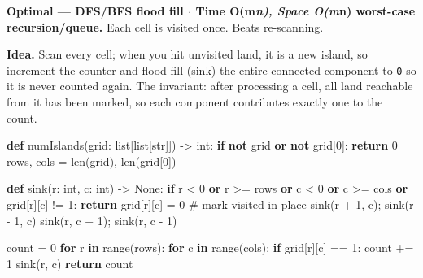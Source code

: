\documentclass[11pt]{article}
\newenvironment{Shaded}{\begin{snugshade}}{\end{snugshade}}
\newcommand{\BuiltInTok}[1]{\textcolor[rgb]{0.50,0.55,0.55}{#1}}
\newcommand{\CommentTok}[1]{\textcolor[rgb]{0.48,0.49,0.49}{#1}}
\newcommand{\ControlFlowTok}[1]{\textcolor[rgb]{0.99,0.74,0.29}{\textbf{#1}}}
\newcommand{\DecValTok}[1]{\textcolor[rgb]{0.96,0.45,0.00}{#1}}
\newcommand{\KeywordTok}[1]{\textcolor[rgb]{0.81,0.81,0.76}{\textbf{#1}}}
\newcommand{\NormalTok}[1]{\textcolor[rgb]{0.81,0.81,0.76}{#1}}
\newcommand{\OperatorTok}[1]{\textcolor[rgb]{0.81,0.81,0.76}{#1}}
\newcommand{\StringTok}[1]{\textcolor[rgb]{0.96,0.31,0.31}{#1}}
\newcommand{\VariableTok}[1]{\textcolor[rgb]{0.15,0.68,0.68}{#1}}
\begin{document}
\textbf{Optimal --- DFS/BFS flood fill \(\cdot\) Time O(m\emph{n), Space O(m}n) worst-case recursion/queue.} Each cell is visited once. Beats re-scanning.

\textbf{Idea.} Scan every cell; when you hit unvisited land, it is a new island, so increment the counter and flood-fill (sink) the entire connected component to \texttt{\textquotesingle{}0\textquotesingle{}} so it is never counted again. The invariant: after processing a cell, all land reachable from it has been marked, so each component contributes exactly one to the count.


\begin{Shaded}
\begin{Highlighting}[]
\KeywordTok{def}\NormalTok{ numIslands(grid: }\BuiltInTok{list}\NormalTok{[}\BuiltInTok{list}\NormalTok{[}\BuiltInTok{str}\NormalTok{]]) }\OperatorTok{{-}\textgreater{}} \BuiltInTok{int}\NormalTok{:}
    \ControlFlowTok{if} \KeywordTok{not}\NormalTok{ grid }\KeywordTok{or} \KeywordTok{not}\NormalTok{ grid[}\DecValTok{0}\NormalTok{]:}
        \ControlFlowTok{return} \DecValTok{0}
\NormalTok{    rows, cols }\OperatorTok{=} \BuiltInTok{len}\NormalTok{(grid), }\BuiltInTok{len}\NormalTok{(grid[}\DecValTok{0}\NormalTok{])}

    \KeywordTok{def}\NormalTok{ sink(r: }\BuiltInTok{int}\NormalTok{, c: }\BuiltInTok{int}\NormalTok{) }\OperatorTok{{-}\textgreater{}} \VariableTok{None}\NormalTok{:}
        \ControlFlowTok{if}\NormalTok{ r }\OperatorTok{\textless{}} \DecValTok{0} \KeywordTok{or}\NormalTok{ r }\OperatorTok{\textgreater{}=}\NormalTok{ rows }\KeywordTok{or}\NormalTok{ c }\OperatorTok{\textless{}} \DecValTok{0} \KeywordTok{or}\NormalTok{ c }\OperatorTok{\textgreater{}=}\NormalTok{ cols }\KeywordTok{or}\NormalTok{ grid[r][c] }\OperatorTok{!=} \StringTok{\textquotesingle{}1\textquotesingle{}}\NormalTok{:}
            \ControlFlowTok{return}
\NormalTok{        grid[r][c] }\OperatorTok{=} \StringTok{\textquotesingle{}0\textquotesingle{}}  \CommentTok{\# mark visited in{-}place}
\NormalTok{        sink(r }\OperatorTok{+} \DecValTok{1}\NormalTok{, c)}\OperatorTok{;}\NormalTok{ sink(r }\OperatorTok{{-}} \DecValTok{1}\NormalTok{, c)}
\NormalTok{        sink(r, c }\OperatorTok{+} \DecValTok{1}\NormalTok{)}\OperatorTok{;}\NormalTok{ sink(r, c }\OperatorTok{{-}} \DecValTok{1}\NormalTok{)}

\NormalTok{    count }\OperatorTok{=} \DecValTok{0}
    \ControlFlowTok{for}\NormalTok{ r }\KeywordTok{in} \BuiltInTok{range}\NormalTok{(rows):}
        \ControlFlowTok{for}\NormalTok{ c }\KeywordTok{in} \BuiltInTok{range}\NormalTok{(cols):}
            \ControlFlowTok{if}\NormalTok{ grid[r][c] }\OperatorTok{==} \StringTok{\textquotesingle{}1\textquotesingle{}}\NormalTok{:}
\NormalTok{                count }\OperatorTok{+=} \DecValTok{1}
\NormalTok{                sink(r, c)}
    \ControlFlowTok{return}\NormalTok{ count}
\end{Highlighting}
\end{Shaded}
\end{document}
